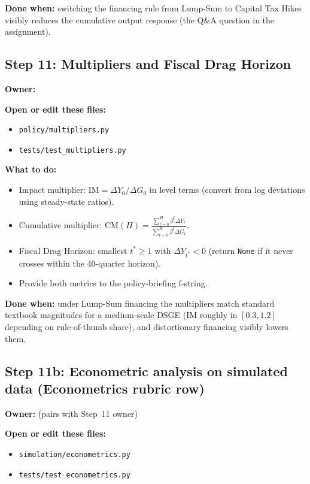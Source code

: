 \documentclass[11pt]{article}
\newcommand{\nameblank}{\underline{\hspace{4.5cm}}}
\begin{document}
\textbf{Done when:} switching the financing rule from Lump-Sum to Capital Tax Hikes visibly reduces the cumulative output response (the Q\&A question in the assignment).

\subsection{Step 11: Multipliers and Fiscal Drag Horizon}
\textbf{Owner:} \nameblank

\textbf{Open or edit these files:}
\begin{itemize}
    \item \texttt{policy/multipliers.py}
    \item \texttt{tests/test\_multipliers.py}
\end{itemize}

\textbf{What to do:}
\begin{itemize}
    \item Impact multiplier: $\text{IM} = \Delta Y_0 / \Delta G_0$ in level terms (convert from log deviations using steady-state ratios).
    \item Cumulative multiplier: $\text{CM}(H) = \frac{\sum_{t=0}^{H} \beta^t \Delta Y_t}{\sum_{t=0}^{H} \beta^t \Delta G_t}$.
    \item Fiscal Drag Horizon: smallest $t^{\ast}\geq 1$ with $\Delta Y_{t^{\ast}} < 0$ (return \texttt{None} if it never crosses within the 40-quarter horizon).
    \item Provide both metrics to the policy-briefing f-string.
\end{itemize}

\textbf{Done when:} under Lump-Sum financing the multipliers match standard textbook magnitudes for a medium-scale DSGE (IM roughly in $[0.3, 1.2]$ depending on rule-of-thumb share), and distortionary financing visibly lowers them.

\subsection{Step 11b: Econometric analysis on simulated data (Econometrics rubric row)}
\textbf{Owner:} \nameblank{} (pairs with Step~11 owner)

\textbf{Open or edit these files:}
\begin{itemize}
    \item \texttt{simulation/econometrics.py}
    \item \texttt{tests/test\_econometrics.py}
\end{itemize}
\end{document}
